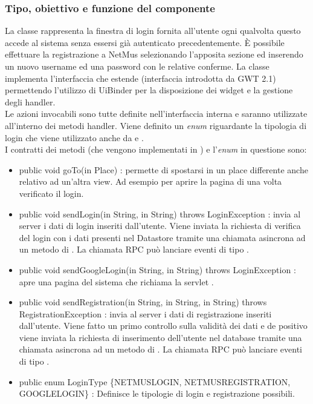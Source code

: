 \subsubsection*{Tipo, obiettivo e funzione del componente}
La classe  rappresenta la finestra di login fornita all'utente
ogni qualvolta questo accede al sistema senza essersi gi\`a autenticato
precedentemente. \`E possibile effettuare la registrazione a NetMus
selezionando l'apposita sezione ed inserendo un nuovo username ed una password
con le relative conferme. La classe  implementa l'interfaccia
 che estende  (interfaccia introdotta da GWT 2.1)
permettendo l'utilizzo di UiBinder per la disposizione dei widget e la gestione
degli handler. \\
Le azioni invocabili
sono tutte definite nell'interfaccia interna
 e saranno utilizzate all'interno dei metodi handler. Viene
definito un \emph{enum} riguardante la tipologia di login che viene utilizzato
anche da  e . \\ I contratti dei metodi (che vengono
implementati in ) e l'\emph{enum} in questione sono:
\begin{itemize}
  \item public void goTo(in Place) : permette di spostarsi in un
  place differente anche relativo ad un'altra view. Ad esempio per aprire la pagina di
   una volta verificato il login.
  \item public void sendLogin(in String, in String) throws  LoginException
  : invia al server i dati di login inseriti
  dall'utente. Viene inviata la richiesta di verifica del login con i dati
  presenti nel Datastore tramite una chiamata asincrona ad un metodo di
  . La chiamata RPC pu\`o lanciare eventi di tipo
  .
  \item public void sendGoogleLogin(in String, in String)
  throws LoginException : apre una pagina del sistema che richiama la servlet
  .
  \item public void sendRegistration(in String, in String, in String)
  throws RegistrationException : invia al server i dati di registrazione inseriti
  dall'utente. Viene fatto un primo controllo sulla validit\`a dei dati e de
  positivo viene inviata la richiesta di inserimento dell'utente nel database
  tramite una chiamata asincrona ad un metodo di . La chiamata
  RPC pu\`o lanciare eventi di tipo .
  \item public enum LoginType \{NETMUSLOGIN, NETMUSREGISTRATION,
  GOOGLELOGIN\} : Definisce le tipologie di login e registrazione possibili.
\end{itemize}
